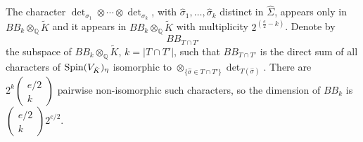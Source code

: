 \documentclass[12pt]{amsart}
\newcommand{\hide}[1]{}
\numberwithin{equation}{subsection}
\theoremstyle{plain}
\theoremstyle{definition}
\newcommand{\QQ}{{\mathbb Q}}
\newcommand{\T}{{\mathcal T}}
\newcommand{\Spin}{{\rm Spin}}
\newcommand{\Choose}[2]
{\left(\!\!\begin{array}{c}#1\\#2\end{array}\!\!\right)}
\begin{document}
{%
\hide{
Consider the decreasing filtration $F_k(B\otimes_\QQ B):=\oplus_{i\geq k}BB_i$
and the increasing filtration $F^k\wedge^*V_\QQ:=\oplus_{i\leq k}\wedge^iV_\QQ$.
The isomorphism $\tilde{\varphi}:S_\QQ\otimes_\QQ S_\QQ\rightarrow \wedge^*V_\QQ$, given in (\ref{eq-tilde-varphi}),
maps $F_k(B\otimes_\QQ B)$ into $F^{d(e-k)}(\wedge^*V_\QQ)$, but the image of $F_k(B\otimes_\QQ B)$ is not contained in $F^{d(e-k)-1}(\wedge^*V_\QQ)$, by \cite[III.3.3]{chevalley}. 
We get the induced homomorphism $BB_k\rightarrow \wedge^{d(e-k)}V_\QQ$. 
The proof of \cite[III.3.3]{chevalley} shows furthermore that the image of $\ell_T\otimes\ell_{T'}$ in $\wedge^{d(e-k)}V_\QQ$ is the top exterior power of 
the subspace $W_T+ W_{T'}$ of $V_{\tilde{K}}$.
The associated homomorphism $BB_k\otimes_\QQ\tilde{K}\rightarrow \wedge^{d(e-k)}V_{\tilde{K}}$
is furthermore $\Spin(V_{\tilde{K}})_\eta$-equivariant. 
The image of the induced homomorphism 
$BB_1\otimes_\QQ\tilde{K}\rightarrow \wedge^{d(e-1)}V_{\tilde{K}}$ is thus 
\[
\bigoplus_{\sigma\in\Sigma}
\wedge^{d(e-1)}\left(\bigoplus_{\{\sigma' \ : \ \sigma'\neq \sigma\}}V_{\sigma'}
\right).
\] 
The isomorphism $\phi\circ (id\otimes\tau)$, $\phi$ as in Lemma \ref{lemma-orlov-isomorphism-is-chevalley}, maps 
$F_k(B\otimes_\QQ B)$ into $F_{dk}(\wedge^*V_\QQ)$ and the induced homomorphism on the graded summands maps 
$BB_1$ onto $HW$.

}

The character $\det_{\sigma_1}\otimes \cdots \otimes \det_{\sigma_k}$, with $\hat{\sigma}_1, \dots, \hat{\sigma}_k$ distinct in $\hat{\Sigma}$,
appears only in $BB_k\otimes_\QQ\tilde{K}$ and it appears in $BB_k\otimes_\QQ\tilde{K}$ with multiplicity $2^{(\frac{e}{2}-k)}$.
Denote by 
\[
BB_{T\cap T'}
\] 
the subspace of $BB_k\otimes_\QQ\tilde{K}$, $k=|T\cap T'|$, such that $BB_{T\cap T'}$ is the direct sum of all 
characters of $\Spin(V_{\tilde{K}})_\eta$ isomorphic to $\otimes_{\{\hat{\sigma}\in T\cap T'\}}\det_{T(\hat{\sigma})}$. 
There are $2^k\Choose{e/2}{k}$ pairwise non-isomorphic such characters, so the dimension of $BB_k$ is $\Choose{e/2}{k}2^{e/2}$.
% 
}
\end{document}
